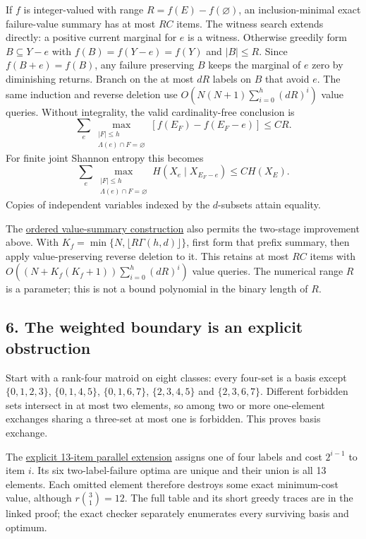 If \(f\) is integer-valued with range \(R=f(E)-f(\varnothing)\), an inclusion-minimal exact failure-value summary has at most \(RC\) items. The witness search extends directly: a positive current marginal for \(e\) is a witness. Otherwise greedily form \(B\subseteq Y-e\) with \(f(B)=f(Y-e)=f(Y)\) and \(|B|\le R\). Since \(f(B+e)=f(B)\), any failure preserving \(B\) keeps the marginal of \(e\) zero by diminishing returns. Branch on the at most \(dR\) labels on \(B\) that avoid \(e\). The same induction and reverse deletion use \(O(N(N+1)\sum_{i=0}^{h}(dR)^i)\) value queries. Without integrality, the valid cardinality-free conclusion is \[
\sum_e\max_{\substack{|F|\le h\\\Lambda(e)\cap F=\varnothing}}
 [f(E_F)-f(E_F-e)]\le C R.
\] For finite joint Shannon entropy this becomes \[
\sum_e\max_{\substack{|F|\le h\\\Lambda(e)\cap F=\varnothing}}
 H(X_e\mid X_{E_F-e})\le C H(X_E).
\] Copies of independent variables indexed by the \(d\)-subsets attain equality.

The \href{https://github.com/icekylinx/algorithm-frontier/blob/main/problems/matroid-failure-summaries/manuscripts/weighted-oracle-prefix-fpt-construction.md\#7-integral-submodular-prefix-values}{ordered value-summary construction} also permits the two-stage improvement above. With \(K_f=\min\{N,\lfloor R\Gamma(h,d)\rfloor\}\), first form that prefix summary, then apply value-preserving reverse deletion to it. This retains at most \(RC\) items with \(O((N+K_f(K_f+1))\sum_{i=0}^{h}(dR)^i)\) value queries. The numerical range \(R\) is a parameter; this is not a bound polynomial in the binary length of \(R\).

\hypertarget{af-240b5086c5-the-weighted-boundary-is-an-explicit-obstruction}{%
\subsection{6. The weighted boundary is an explicit obstruction}\label{af-240b5086c5-the-weighted-boundary-is-an-explicit-obstruction}}

Start with a rank-four matroid on eight classes: every four-set is a basis except \(\{0,1,2,3\}\), \(\{0,1,4,5\}\), \(\{0,1,6,7\}\), \(\{2,3,4,5\}\) and \(\{2,3,6,7\}\). Different forbidden sets intersect in at most two elements, so among two or more one-element exchanges sharing a three-set at most one is forbidden. This proves basis exchange.

The \href{https://github.com/icekylinx/algorithm-frontier/blob/main/problems/matroid-failure-summaries/manuscripts/weighted-oracle-two-failure-obstruction.md\#3-the-13-ordered-colored-items}{explicit 13-item parallel extension} assigns one of four labels and cost \(2^{i-1}\) to item \(i\). Its six two-label-failure optima are unique and their union is all 13 elements. Each omitted element therefore destroys some exact minimum-cost value, although \(r\binom31=12\). The full table and its short greedy traces are in the linked proof; the exact checker separately enumerates every surviving basis and optimum.

